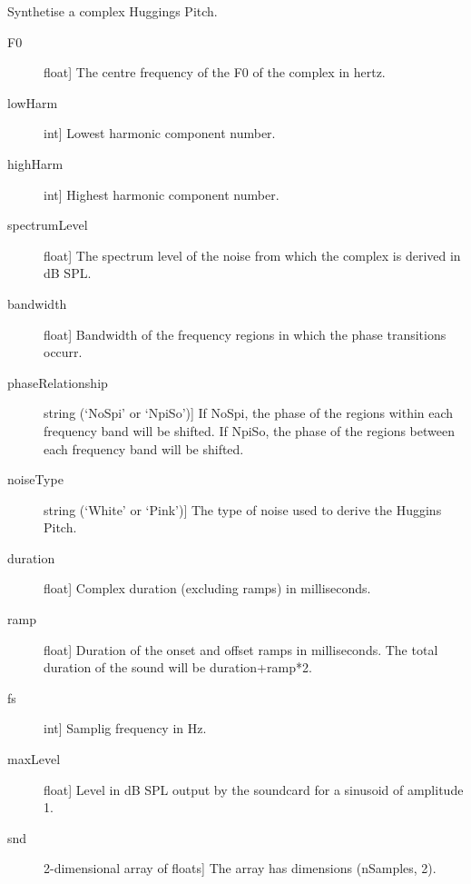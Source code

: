 \documentclass[letterpaper,10pt,english]{sphinxmanual}
\begin{document}
\begin{fulllineitems}
\label{index:sndlib.makeHuggins}
Synthetise a complex Huggings Pitch.
\begin{description}
\item[{F0}] \leavevmode{[}float{]}
The centre frequency of the F0 of the complex in hertz.

\item[{lowHarm}] \leavevmode{[}int{]}
Lowest harmonic component number.

\item[{highHarm}] \leavevmode{[}int{]}
Highest harmonic component number.

\item[{spectrumLevel}] \leavevmode{[}float{]}
The spectrum level of the noise from which
the complex is derived in dB SPL.

\item[{bandwidth}] \leavevmode{[}float{]}
Bandwidth of the frequency regions in which the
phase transitions occurr.

\item[{phaseRelationship}] \leavevmode{[}string (`NoSpi' or `NpiSo'){]}
If NoSpi, the phase of the regions within each frequency band will
be shifted. If NpiSo, the phase of the regions between each
frequency band will be shifted.

\item[{noiseType}] \leavevmode{[}string (`White' or `Pink'){]}
The type of noise used to derive the Huggins Pitch.

\item[{duration}] \leavevmode{[}float{]}
Complex duration (excluding ramps) in milliseconds.

\item[{ramp}] \leavevmode{[}float{]}
Duration of the onset and offset ramps in milliseconds.
The total duration of the sound will be duration+ramp*2.

\item[{fs}] \leavevmode{[}int{]}
Samplig frequency in Hz.

\item[{maxLevel}] \leavevmode{[}float{]}
Level in dB SPL output by the soundcard for a sinusoid of amplitude 1.

\end{description}
\begin{description}
\item[{snd}] \leavevmode{[}2-dimensional array of floats{]}
The array has dimensions (nSamples, 2).


\end{description}
\end{fulllineitems}
\end{document}

